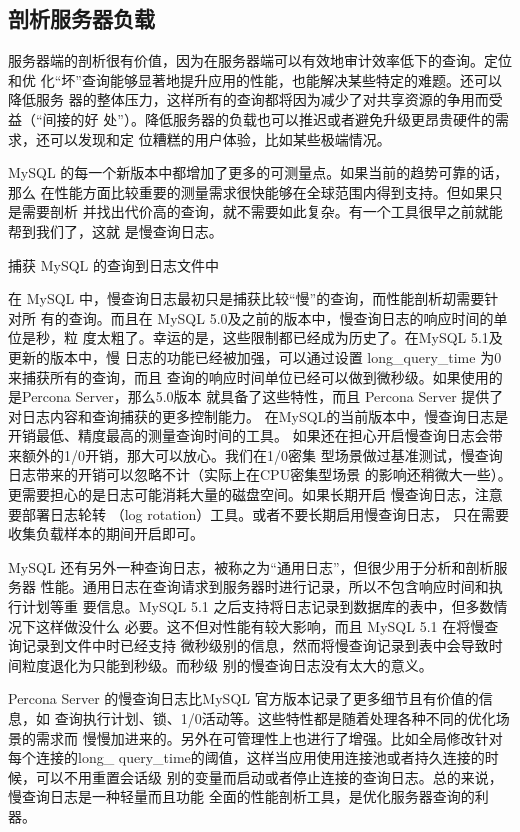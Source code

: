 \subsection{剖析服务器负载}
服务器端的剖析很有价值，因为在服务器端可以有效地审计效率低下的查询。定位和优
化“坏”查询能够显著地提升应用的性能，也能解决某些特定的难题。还可以降低服务
器的整体压力，这样所有的查询都将因为减少了对共享资源的争用而受益（“间接的好
处”）。降低服务器的负载也可以推迟或者避免升级更昂贵硬件的需求，还可以发现和定
位糟糕的用户体验，比如某些极端情况。

MySQL 的每一个新版本中都增加了更多的可测量点。如果当前的趋势可靠的话，那么
在性能方面比较重要的测量需求很快能够在全球范围内得到支持。但如果只是需要剖析
并找出代价高的查询，就不需要如此复杂。有一个工具很早之前就能帮到我们了，这就
是慢查询日志。

捕获 MySQL 的查询到日志文件中

在 MySQL 中，慢查询日志最初只是捕获比较“慢”的查询，而性能剖析刧需要针对所
有的查询。而且在 MySQL 5.0及之前的版本中，慢查询日志的响应时间的单位是秒，粒
度太粗了。幸运的是，这些限制都已经成为历史了。在MySQL 5.1及更新的版本中，慢
日志的功能已经被加强，可以通过设置 long\_query\_time 为0来捕获所有的查询，而且
查询的响应时间单位已经可以做到微秒级。如果使用的是Percona Server，那么5.0版本
就具备了这些特性，而且 Percona Server 提供了对日志内容和查询捕获的更多控制能力。
在MySQL的当前版本中，慢查询日志是开销最低、精度最高的测量查询时间的工具。
如果还在担心开启慢查询日志会带来额外的1/0开销，那大可以放心。我们在1/0密集
型场景做过基准测试，慢查询日志带来的开销可以忽略不计（实际上在CPU密集型场景
的影响还稍微大一些）。更需要担心的是日志可能消耗大量的磁盘空间。如果长期开启
慢查询日志，注意要部署日志轮转 （log rotation）工具。或者不要长期启用慢查询日志，
只在需要收集负载样本的期间开启即可。

MySQL 还有另外一种查询日志，被称之为“通用日志”，但很少用于分析和剖析服务器
性能。通用日志在查询请求到服务器时进行记录，所以不包含响应时间和执行计划等重
要信息。MySQL 5.1 之后支持将日志记录到数据库的表中，但多数情况下这样做没什么
必要。这不但对性能有较大影响，而且 MySQL 5.1 在将慢查询记录到文件中时已经支持
微秒级别的信息，然而将慢查询记录到表中会导致时间粒度退化为只能到秒级。而秒级
别的慢查询日志没有太大的意义。

Percona Server 的慢查询日志比MySQL 官方版本记录了更多细节且有价值的信息，如
查询执行计划、锁、1/0活动等。这些特性都是随着处理各种不同的优化场景的需求而
慢慢加进来的。另外在可管理性上也进行了增强。比如全局修改针对每个连接的long\_
query\_time的阈值，这样当应用使用连接池或者持久连接的时候，可以不用重置会话级
别的变量而启动或者停止连接的查询日志。总的来说，慢查询日志是一种轻量而且功能
全面的性能剖析工具，是优化服务器查询的利器。

